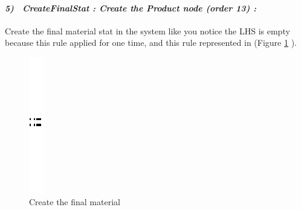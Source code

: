 \paragraph{\emph{5)~ CreateFinalStat : Create the Product node (order 13) :} }
Create the final material stat in the system like you notice the LHS is empty because this rule applied for one time, and this rule represented in 
(Figure \ref{fig:Create the final material} ).

\vspace{1cm}
\begin{figure}[th]
\centering
	\quad{}
		\includegraphics{ch3/img/sep}
	\quad{}
\caption{\label{fig:Create the final material}Create the final material}
 
\end{figure}
\vspace{1cm}

